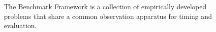     
    \begin{figure}[h!]
        \begin{center}
            
            \caption{The \gai Benchmark Framework is a collection of empirically developed problems that share a common observation apparatus for timing and evaluation.}
            \label{Figure:gai-framework}
        \end{center}
    \end{figure}

